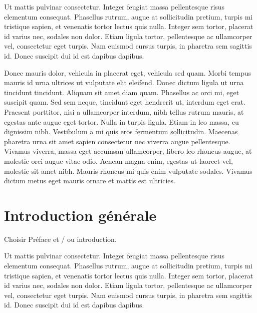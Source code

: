 \documentclass{FramateX}
\begin{document}
Ut mattis pulvinar consectetur. Integer feugiat massa pellentesque risus elementum consequat. Phasellus rutrum, augue at sollicitudin pretium, turpis mi tristique sapien, et venenatis tortor lectus quis nulla. Integer sem tortor, placerat id varius nec, sodales non dolor. Etiam ligula tortor, pellentesque ac ullamcorper vel, consectetur eget turpis. Nam euismod cursus turpis, in pharetra sem sagittis id. Donec suscipit dui id est dapibus dapibus.

Donec mauris dolor, vehicula in placerat eget, vehicula sed quam. Morbi tempus mauris id urna ultrices ut vulputate elit eleifend. Donec dictum ligula ut urna tincidunt tincidunt. Aliquam sit amet diam quam. Phasellus ac orci mi, eget suscipit quam. Sed sem neque, tincidunt eget hendrerit ut, interdum eget erat. Praesent porttitor, nisi a ullamcorper interdum, nibh tellus rutrum mauris, at egestas ante augue eget tortor. Nulla in turpis ligula. Etiam in leo massa, eu dignissim nibh. Vestibulum a mi quis eros fermentum sollicitudin. Maecenas pharetra urna sit amet sapien consectetur nec viverra augue pellentesque. Vivamus viverra, massa eget accumsan ullamcorper, libero leo rhoncus augue, at molestie orci augue vitae odio. Aenean magna enim, egestas ut laoreet vel, molestie sit amet nibh. Mauris rhoncus mi quis enim vulputate sodales. Vivamus dictum metus eget mauris ornare et mattis est ultricies.


%
\cleardoublepage

\chapter*{Introduction générale}
{}
%

                    

Choisir Préface et / ou introduction.

Ut mattis pulvinar consectetur. Integer feugiat massa pellentesque risus elementum consequat. Phasellus rutrum, augue at sollicitudin pretium, turpis mi tristique sapien, et venenatis tortor lectus quis nulla. Integer sem tortor, placerat id varius nec, sodales non dolor. Etiam ligula tortor, pellentesque ac ullamcorper vel, consectetur eget turpis. Nam euismod cursus turpis, in pharetra sem sagittis id. Donec suscipit dui id est dapibus dapibus.
\end{document}
